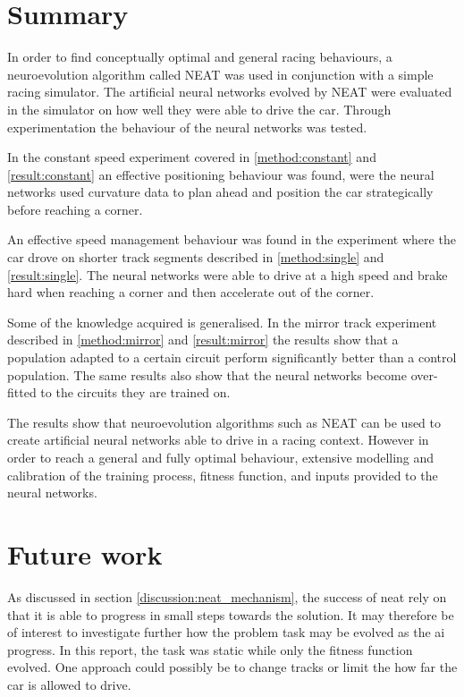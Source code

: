 \chapter{Summary}




In order to find conceptually optimal and general racing behaviours, a neuroevolution algorithm called NEAT was used in conjunction with a simple racing simulator. The artificial neural networks evolved by NEAT were evaluated in the simulator on how well they were able to drive the car. Through experimentation the behaviour of the neural networks was tested. 

In the constant speed experiment covered in \ref{method:constant} and \ref{result:constant} an effective positioning behaviour was found, were the neural networks used curvature data to plan ahead and position the car strategically before reaching a corner. 

An effective speed management behaviour was found in the experiment where the car drove on shorter track segments described in \ref{method:single} and \ref{result:single}. The neural networks were able to drive at a high speed and brake hard when reaching a corner and then accelerate out of the corner. 

Some of the knowledge acquired is generalised. In the mirror track experiment described in \ref{method:mirror} and \ref{result:mirror} the results show that a population adapted to a certain circuit perform significantly better than a control population. The same results also show that the neural networks become over-fitted to the circuits they are trained on. 

The results show that neuroevolution algorithms such as NEAT can be used to create artificial neural networks able to drive in a racing context. However in order to reach a general and fully optimal behaviour, extensive modelling and calibration of the training process, fitness function, and inputs provided to the neural networks.  

\chapter{Future work}
As discussed in section \ref{discussion:neat_mechanism}, the success of neat rely on that it is able to progress in small steps towards the solution. It may therefore be of interest to investigate further how the problem task may be evolved as the ai progress. In this report, the task was static while only the fitness function evolved. One approach could possibly be to change tracks or limit the how far the car is allowed to drive.

